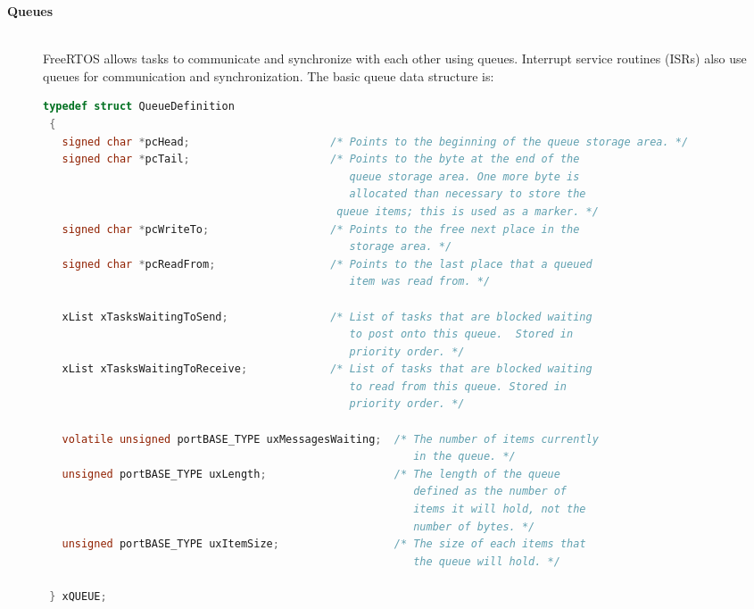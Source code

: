 \begin{description}
\os{\newpage}



\item[{\rot\bf Queues}]~\\[-3ex]
\bi
\ite FreeRTOS allows tasks to communicate and synchronize with each other using queues.
\ite Interrupt service routines (ISRs) also use queues for communication and synchronization.
\ite
\ite The basic queue data structure is:
\begin{lstlisting}[language=C]
 typedef struct QueueDefinition
 {
   signed char *pcHead;                      /* Points to the beginning of the queue storage area. */
   signed char *pcTail;                      /* Points to the byte at the end of the
                                                queue storage area. One more byte is
                                                allocated than necessary to store the
                                              queue items; this is used as a marker. */
   signed char *pcWriteTo;                   /* Points to the free next place in the
                                                storage area. */
   signed char *pcReadFrom;                  /* Points to the last place that a queued
                                                item was read from. */

   xList xTasksWaitingToSend;                /* List of tasks that are blocked waiting
                                                to post onto this queue.  Stored in
                                                priority order. */
   xList xTasksWaitingToReceive;             /* List of tasks that are blocked waiting
                                                to read from this queue. Stored in
                                                priority order. */

   volatile unsigned portBASE_TYPE uxMessagesWaiting;  /* The number of items currently
                                                          in the queue. */
   unsigned portBASE_TYPE uxLength;                    /* The length of the queue
                                                          defined as the number of
                                                          items it will hold, not the
                                                          number of bytes. */
   unsigned portBASE_TYPE uxItemSize;                  /* The size of each items that
                                                          the queue will hold. */

 } xQUEUE;
\end{lstlisting}
\ei


\end{description}
